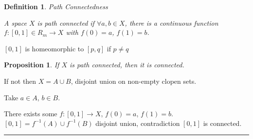 \documentclass[twoside]{article}
\newtheorem{proposition}[theorem]{Proposition}
\newtheorem{definition}[theorem]{Definition}
\newenvironment{proof}{{\bf Proof:}}{\hfill\rule{2mm}{2mm}}
\begin{document}
\begin{definition}
    Path Connectedness

    A space $X$ is path connected if $\forall a, b \in X$, there is a continuous function $f: [0,1] \in R_m \rightarrow X$ with $f(0) = a$, $f(1) = b$. 
\end{definition}

$[0,1]$ is homeomorphic to $[p,q]$ if $p \neq q$

\begin{proposition}
    If $X$ is path connected, then it is connected. 
\end{proposition}

\begin{proof}
    If not then $X = A \cup B$, disjoint union on non-empty clopen sets. 

    Take $a \in A$, $b \in B$. 

    There exists some $f:[0,1] \rightarrow X$, $f(0)=a$, $f(1) = b$. $[0,1] = f^{-1}(A) \cup f^{-1}(B)$ disjoint union, contradiction $[0,1]$ is connected. 
\end{proof}
\end{document}

